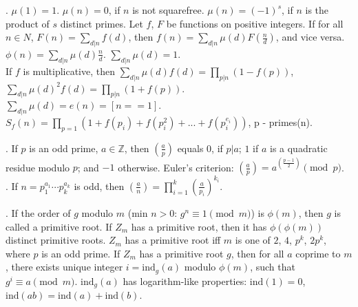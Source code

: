 .
$\mu(1) = 1$. $\mu(n) = 0$, if $n$ is not squarefree.
$\mu(n) = (-1)^s$, if $n$ is the product of $s$ distinct primes.
Let $f$, $F$ be functions on positive integers.
If for all $n \in N$, $F(n)=\sum_{d|n} f(d)$, then $f(n) = \sum_{d|n} \mu(d) F(\frac{n}{d})$,
and vice versa. \quad
$\phi(n) = \sum_{d|n} \mu(d) \frac{n}{d}$.
\quad $\sum_{d|n} \mu(d) = 1$. \\
If $f$ is multiplicative, then $\sum_{d|n} \mu(d) f(d) = \prod_{p|n}(1-f(p))$,
$\sum_{d|n} \mu(d)^2 f(d) = \prod_{p|n} (1+f(p))$. \\
$\sum_{d|n} \mu(d) = e(n) = [n==1]$. \\
$S_{f}(n) = \prod_{p = 1} (1+f(p_i) + f(p_i^2 ) +... + f(p_i^{e_i})) $, p - primes(n). 


. If $p$ is an odd prime, $a \in {\mathbb Z}$, then
$\left(\frac{a}{p}\right)$ equals $0$, if $p | a$; $1$ if $a$ is a quadratic
residue modulo $p$; and $-1$ otherwise.
Euler's criterion:
$\left(\frac{a}{p}\right)=a^{\left(\frac{p-1}{2}\right)} \pmod p$. \\
.  %
If $n=p_1^{a_1} \cdots p_k^{a_k}$ is odd, then
$\left(\frac{a}{n}\right) = \prod_{i=1}^k \left(\frac{a}{p_i}\right)^{k_i}$.


.  If the order of $g$ modulo $m$ (min $n>0$:
$g^n \equiv 1 \pmod{m}$) is $\phi(m)$, then $g$ is called a primitive root.
If $Z_m$ has a primitive root, then it has $\phi(\phi(m))$ distinct primitive
roots. $Z_m$ has a primitive root iff $m$ is one of $2$, $4$,
$p^k$, $2p^k$, where $p$ is an odd prime.
If $Z_m$ has a primitive root $g$, then for all $a$ coprime to $m$,
there exists unique integer $i=\text{ind}_g(a)$ modulo $\phi(m)$,
such that $g^i \equiv a \pmod{m}$.
$\text{ind}_g(a)$ has logarithm-like properties:
$\text{ind}(1) = 0$, $\text{ind}(ab) = \text{ind}(a) + \text{ind}(b)$.

